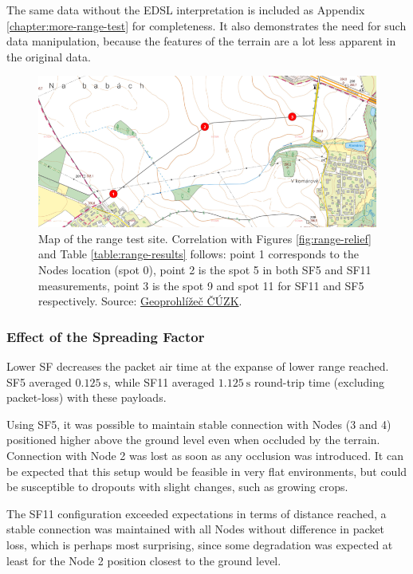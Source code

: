 The same data without the EDSL interpretation is included as Appendix \ref{chapter:more-range-test} for completeness. It also demonstrates the need for such data manipulation, because the features of the terrain are a lot less apparent in the original data.

\begin{figure}[p]
    \includegraphics[width=.9\textwidth]{img/range-test-map.png}
    \caption{\label{fig:range-test-map}Map of the range test site. Correlation with Figures \ref{fig:range-relief} and Table \ref{table:range-results} follows: point 1 corresponds to the Nodes location (spot 0), point 2 is the spot 5 in both SF5 and SF11 measurements, point 3 is the spot 9 and spot 11 for SF11 and SF5 respectively. Source: \href{https://ags.cuzk.cz/geoprohlizec}{Geoprohlížeč ČÚZK}.}
\end{figure}

\subsubsection{Effect of the Spreading Factor}
Lower SF decreases the packet air time at the expanse of lower range reached. SF5 averaged $0.125~\mathrm{s}$, while SF11 averaged $1.125~\mathrm{s}$ round-trip time (excluding packet-loss) with these payloads.

Using SF5, it was possible to maintain stable connection with Nodes (3 and 4) positioned higher above the ground level even when occluded by the terrain. Connection with Node 2 was lost as soon as any occlusion was introduced. It can be expected that this setup would be feasible in very flat environments, but could be susceptible to dropouts with slight changes, such as growing crops.

The SF11 configuration exceeded expectations in terms of distance reached, a stable connection was maintained with all Nodes without difference in packet loss, which is perhaps most surprising, since some degradation was expected at least for the Node 2 position closest to the ground level. 

